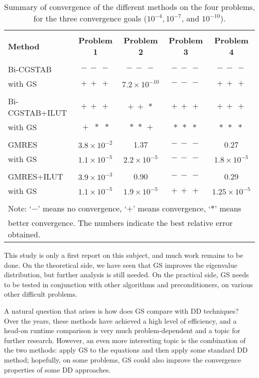 \documentclass[12pt,a4paper]{article}
\newcounter{i}
\def\time{\!\times\!}
\begin{document}
\begin{table}[!h]
\centering
\begin{tabular}{|l|c|c|c|c|}
\hline
&&&&\\[-12pt]
{\bf Method} & {\bf Problem 1} & {\bf Problem 2} & 
{\bf Problem 3} & {\bf Problem 4} \\ 
\hline 
&&&&\\[-12pt]
Bi-CGSTAB & $-~-~-$ & $-~-~-$ & $-~-~-$ & $-~-~-$ \\ 
with GS   & $+~+~+$ & $7.2\time10^{-10}$ &  $-~-~-$ & $+~+~+$ \\
\hline 
&&&&\\[-12pt]
Bi-CGSTAB+ILUT & $+~+~+$ & $+~+~*$ & $+~+~+$ & $+~+~+$ \\
with GS        & $\!+~\,*~~*$ & $\!~*~*~+$ & $*~~*~~*$ & $*~~*~~*$ \\
\hline
&&&&\\[-12pt]
GMRES & $3.8\time 10^{-2}$ & 1.37 & $-~-~-$ & 0.27 \\
with GS & $1.1\time 10^{-5}$ & $2.2\time 10^{-5}$ & $-~-~-$ & 
$1.8\time 10^{-5}$ \\
\hline
&&&&\\[-12pt]
GMRES+ILUT & $3.9\time 10^{-3}$ & 0.90 & $-~-~-$ & 0.29 \\
with GS    & $1.1\time 10^{-5}$ & $1.9\time 10^{-5}$ & $+~+~+$ & 
$1.25\time 10^{-5}$ \\
\hline
\multicolumn{5}{|l|}{}\\[-12pt]
\multicolumn{5}{|l|}{Note: `$-$' means no convergence, `$+$' 
means convergence, `$*$' means} \\
\multicolumn{5}{|l|}{better convergence.  The numbers indicate the 
best relative error obtained.} \\
\hline
\end{tabular}
\caption{Summary of convergence of the different methods on the four 
problems, for the three convergence goals 
($10^{-4}, 10^{-7}$, and $10^{-10}$).}
\label{tbl_sum}
\end{table}

This study is only a first report on this subject, and much work 
remains to be done.  On the theoretical side, we have seen that 
GS improves the eigenvalue distribution, but further analysis is
still needed.  On the practical side, GS needs to be tested in 
conjunction with other algorithms and preconditioners, on various 
other difficult problems.

A natural question that arises is how does GS compare with DD
techniques?  Over the years, these methods have achieved a high 
level of efficiency, and a head-on runtime comparison is very 
much problem-dependent and a topic for further research.
However, an even more interesting topic is the combination of
the two methods: apply GS to the equations and then apply some 
standard DD method; hopefully, on some problems, GS could also 
improve the convergence properties of some DD approaches.
\end{document}

